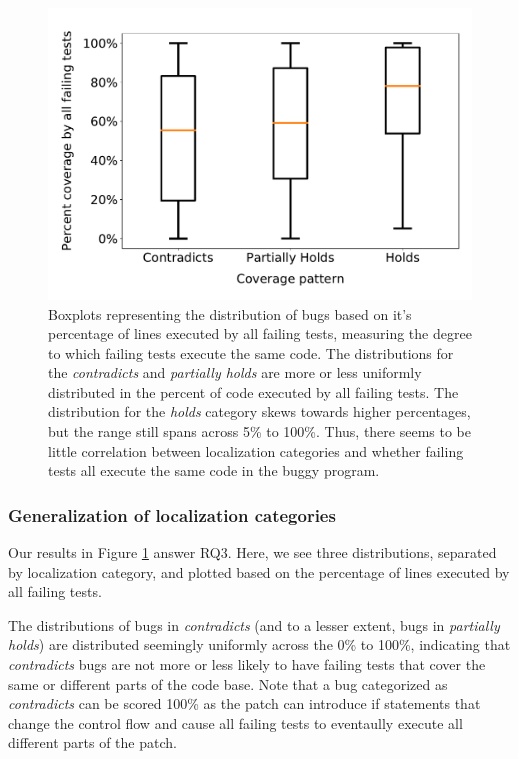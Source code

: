 \documentclass[10pt, conference]{IEEEtran}
\begin{document}
\begin{figure}
	\includegraphics[width=\linewidth,left]{img/coverage-buggy.pdf}
	\caption{Boxplots representing the distribution of bugs based on it's percentage of lines 
	executed by all failing tests, measuring the degree to which failing tests execute the same 
	code. The distributions for the \emph{contradicts} and \emph{partially holds} are more or 
	less uniformly distributed in the percent of code executed by all failing tests. The 
	distribution for the \emph{holds} category skews towards higher percentages, but the range 
	still spans across 5\% to 100\%. Thus, there seems to be little correlation between 
	localization categories and whether failing tests all execute the same code in the buggy 
	program.}
	\label{fig:coverage-buggy}
\end{figure}

\subsubsection{Generalization of localization categories}
Our results in Figure \ref{fig:coverage-buggy} answer RQ3. Here, we see three distributions, 
separated by localization category, and plotted based on the percentage of lines executed by all 
failing tests. 

The distributions of bugs in \emph{contradicts} (and to a lesser extent, bugs in \emph{partially 
holds}) are 
distributed seemingly uniformly across the 0\% to 100\%, indicating that \emph{contradicts} 
bugs 
are 
not more or less likely to have failing tests that cover the same or different parts of the code 
base. Note that a bug categorized as \emph{contradicts} can be scored 100\% as the 
patch can introduce if statements that change the control flow and cause all failing tests to 
eventaully execute all different parts of the patch.
\end{document}
